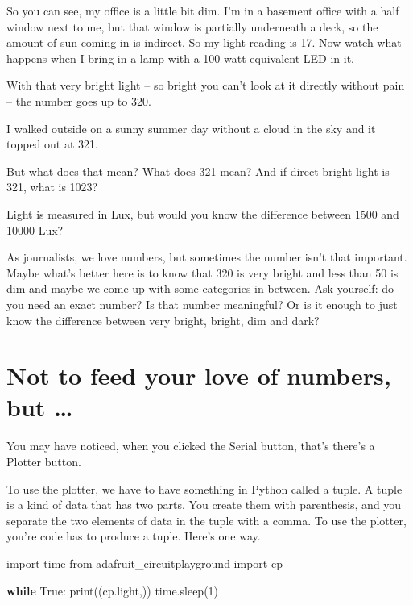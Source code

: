 \documentclass[
]{book}
\newenvironment{Shaded}{\begin{snugshade}}{\end{snugshade}}
\newcommand{\BuiltInTok}[1]{#1}
\newcommand{\ControlFlowTok}[1]{\textcolor[rgb]{0.13,0.29,0.53}{\textbf{#1}}}
\newcommand{\DecValTok}[1]{\textcolor[rgb]{0.00,0.00,0.81}{#1}}
\newcommand{\ImportTok}[1]{#1}
\newcommand{\NormalTok}[1]{#1}
\newcommand{\VariableTok}[1]{\textcolor[rgb]{0.00,0.00,0.00}{#1}}
\begin{document}
So you can see, my office is a little bit dim. I'm in a basement office with a half window next to me, but that window is partially underneath a deck, so the amount of sun coming in is indirect. So my light reading is 17. Now watch what happens when I bring in a lamp with a 100 watt equivalent LED in it.

With that very bright light -- so bright you can't look at it directly without pain -- the number goes up to 320.

I walked outside on a sunny summer day without a cloud in the sky and it topped out at 321.

But what does that mean? What does 321 mean? And if direct bright light is 321, what is 1023?

Light is measured in Lux, but would you know the difference between 1500 and 10000 Lux?

As journalists, we love numbers, but sometimes the number isn't that important. Maybe what's better here is to know that 320 is very bright and less than 50 is dim and maybe we come up with some categories in between. Ask yourself: do you need an exact number? Is that number meaningful? Or is it enough to just know the difference between very bright, bright, dim and dark?

\hypertarget{not-to-feed-your-love-of-numbers-but}{%
\section{Not to feed your love of numbers, but \ldots{}}\label{not-to-feed-your-love-of-numbers-but}}

You may have noticed, when you clicked the Serial button, that's there's a Plotter button.

To use the plotter, we have to have something in Python called a tuple. A tuple is a kind of data that has two parts. You create them with parenthesis, and you separate the two elements of data in the tuple with a comma. To use the plotter, you're code has to produce a tuple. Here's one way.

\begin{Shaded}
\begin{Highlighting}[]
\ImportTok{import}\NormalTok{ time}
\ImportTok{from}\NormalTok{ adafruit_circuitplayground }\ImportTok{import}\NormalTok{ cp}
 
\ControlFlowTok{while} \VariableTok{True}\NormalTok{:}
    \BuiltInTok{print}\NormalTok{((cp.light,))}
\NormalTok{    time.sleep(}\DecValTok{1}\NormalTok{)}
\end{Highlighting}
\end{Shaded}
\end{document}
